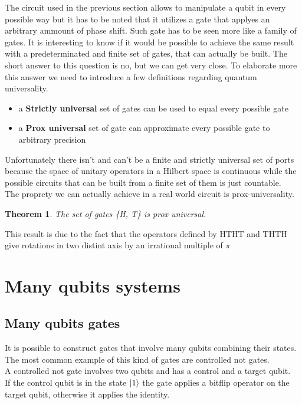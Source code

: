 \documentclass{article}
\newtheorem{theorem}{Theorem}
\begin{document}
The circuit used in the previous section allows to manipulate a qubit in
every possible way but it has to be noted that it utilizes a gate that
applyes an arbitrary ammount of phase shift.
Such gate has to be seen more like a family of gates.
It is interesting to know if it would be possible to achieve the same
result with a predeterminated and finite set of gates, that can actually
be built.
The short answer to this question is no, but we can get very close.
To elaborate more this answer we need to introduce a few definitions
regarding quantum universality.
\begin{itemize}

	\item
	      a \textbf{Strictly universal} set of gates can be used to equal
	      every possible gate


	\item
	      a \textbf{Prox universal} set of gate can approximate every possible gate to
	      arbitrary precision


\end{itemize}

Unfortunately there isn't and can't be a finite and strictly universal
set of ports because the space of unitary operators in a
Hilbert space is continuous while the possible circuits that can be built
from a finite set of them is just countable.\\
The proprety we can actually achieve in a real world circuit is
prox-universality.\\

\begin{theorem}
	The set of gates \{H, T\} is prox universal.
\end{theorem}

This result is due to the fact that the operators defined by HTHT and THTH
give rotations in two distint axis by an irrational multiple of $\pi$



\section{Many qubits systems}



\subsection{Many qubits gates}
It is possible to construct gates that involve many qubits combining their states.\\
The most common example of this kind of gates are controlled not gates.\\
A controlled not gate involves two qubits and has a control and a target qubit.\\
If the control qubit is in the state $\ket{1}$ the gate applies a bitflip
operator on the target qubit, otherwise it applies the identity.
\end{document}
